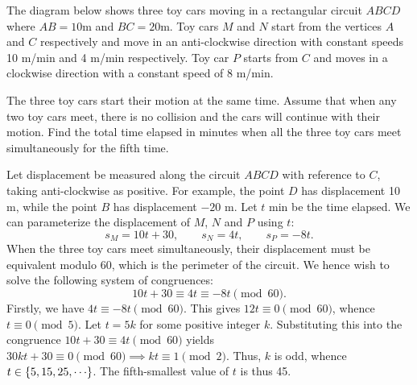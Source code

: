 \begin{question}[45]\label{Q::2024-J-1-24}
    The diagram below shows three toy cars moving in a rectangular circuit $ABCD$ where $AB = 10$m and $BC = 20$m. Toy cars $M$ and $N$ start from the vertices $A$ and $C$ respectively and move in an anti-clockwise direction with constant speeds 10 m/min and 4 m/min respectively. Toy car $P$ starts from $C$ and moves in a clockwise direction with a constant speed of 8 m/min.
    \begin{center}
    \end{center}
    The three toy cars start their motion at the same time. Assume that when any two toy cars meet, there is no collision and the cars will continue with their motion. Find the total time elapsed in minutes when all the three toy cars meet simultaneously for the fifth time.
\end{question}
\begin{solution*}
    Let displacement be measured along the circuit $ABCD$ with reference to $C$, taking anti-clockwise as positive. For example, the point $D$ has displacement 10 m, while the point $B$ has displacement $-20$ m. Let $t$ min be the time elapsed. We can parameterize the displacement of $M$, $N$ and $P$ using $t$: \[s_M = 10t + 30, \qquad s_N = 4t, \qquad s_P = -8t.\] When the three toy cars meet simultaneously, their displacement must be equivalent modulo 60, which is the perimeter of the circuit. We hence wish to solve the following system of congruences: \[10t + 30 \equiv 4t \equiv -8t \pmod{60}.\] Firstly, we have $4t \equiv -8t \pmod{60}$. This gives $12t \equiv 0 \pmod{60}$, whence $t \equiv 0 \pmod{5}$. Let $t = 5k$ for some positive integer $k$. Substituting this into the congruence $10t + 30 \equiv 4t \pmod{60}$ yields $30kt + 30 \equiv 0 \pmod{60} \implies kt \equiv 1 \pmod{2}$. Thus, $k$ is odd, whence $t \in \bc{5, 15, 25, \cdots}$. The fifth-smallest value of $t$ is thus 45.
\end{solution*}

